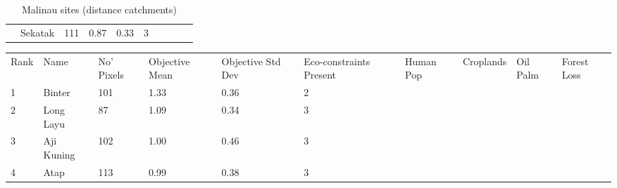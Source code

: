 \begin{table}[ht]
\begin{tabular}{C{0.05\textwidth}C{0.15\textwidth}C{0.08\textwidth}C{0.08\textwidth}C{0.08\textwidth}C{0.08\textwidth}C{0.08\textwidth}C{0.08\textwidth}C{0.08\textwidth}C{0.08\textwidth}}
   & Sekatak & 111 & \textcolor[HTML]{000000}{0.87} & \textcolor[HTML]{FFFFFF}{0.33} & \textcolor[HTML]{FFFFFF}{3} &  &  &  &  \\ 
  \end{tabular}
\endgroup
\caption{Malinau sites (distance catchments)} 
\end{table}
\begin{table}[ht]
\centering
\begingroup\fontsize{9pt}{10pt}\selectfont
\begin{tabular}{C{0.05\textwidth}C{0.15\textwidth}C{0.08\textwidth}C{0.08\textwidth}C{0.08\textwidth}C{0.08\textwidth}C{0.08\textwidth}C{0.08\textwidth}C{0.08\textwidth}C{0.08\textwidth}}
 Rank & Name & No' Pixels & Objective Mean & Objective Std Dev & Eco-constraints  Present & Human Pop & Croplands & Oil Palm & Forest Loss \\ 
 {1} & Binter & 101 & \textcolor[HTML]{FFFFFF}{1.33} & \textcolor[HTML]{000000}{0.36} & \textcolor[HTML]{000000}{2} &  &  &  &  \\ 
  {2} & Long Layu &  87 & \textcolor[HTML]{FFFFFF}{1.09} & \textcolor[HTML]{000000}{0.34} & \textcolor[HTML]{000000}{3} &  &  &  &  \\ 
  {3} & Aji Kuning & 102 & \textcolor[HTML]{000000}{1.00} & \textcolor[HTML]{FFFFFF}{0.46} & \textcolor[HTML]{000000}{3} &  &  &  &  \\ 
  {4} & Atap & 113 & \textcolor[HTML]{000000}{0.99} & \textcolor[HTML]{FFFFFF}{0.38} & \textcolor[HTML]{000000}{3} &  &  &  &  \\ 

\end{tabular}
\end{table}
